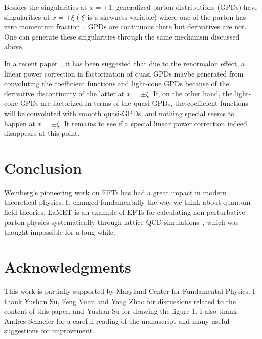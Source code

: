 \documentclass[prd,aps,twocolumn,preprintnumbers,showpacs,nofootinbib,superscriptaddress,notitlepage]{revtex4-1}
\begin{document}
Besides the singularities at $x=\pm 1$, generalized parton distributions (GPDs) have singularities at $x=\pm \xi$ ( $\xi$ is a skewness variable) where one of the parton has zero momentum fraction~\cite{Muller:1994ses,Ji:1996ek}. GPDs are continuous there but derivatives are not. 
One can generate these singularities through the same 
mechanism discussed above.  

In a recent paper~\cite{Braun:2024snf}, it has been suggested that due to the renormalon effect, a linear power correction in factorization of quasi GPDs maybe generated from convoluting the coefficient functions and light-cone GPDs because of the derivative discontinuity of the latter at $x=\pm \xi$. If, on the other hand, the light-cone GPDs are factorized in terms of the quasi GPDs, the coefficient functions will be convoluted with smooth quasi-GPDs, and nothing special seems to happen at  $x=\pm \xi$. It remains to see if a special linear power correction indeed disappears at this point. 
\\

\section{Conclusion}

Weinberg's pioneering work on EFTs has had a great impact in modern theoretical physics. It changed fundamentally the way we think about quantum field theories. LaMET is an example of EFTs for calculating non-perturbative parton physics systematically through lattice QCD simulations~\cite{Ji:2020ect}, 
which was thought impossible for a long while.   

\section*{Acknowledgments}

This work is partially supported by Maryland Center for Fundamental Physics. I thank Yushan Su, Feng Yuan and Yong Zhao for discussions related to the content of this paper, and Yushan Su for drawing the figure 1. I also thank Andres Schaefer for a careful reading of the manuscript and many useful suggestions for improvement. 


\end{document}
